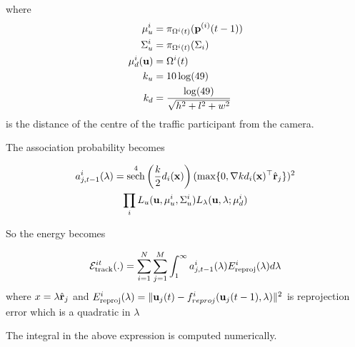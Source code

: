 \documentclass[10pt,twocolumn,letterpaper]{article}
\DeclareMathOperator{\sech}{sech}
\begin{document}
where 
\begin{align}
  \mu_u^i &= \pi_{\Omega^{i}(t)}(\mathbf{p}^{(i)}(t-1)) \\
  \Sigma_u^i &= \pi_{\Omega^{i}(t)}(\Sigma_i)\\
  \mu^i_d(\mathbf{u}) &= \Omega^{i}(t)\\
  k_u &= 10\log(49)\\
  k_d &= \frac{\log(49)}{\sqrt{h^2 + l^2 + w^2}}
  \label{eq:ptransmissionInit}
\end{align}
is the distance of the centre of the traffic participant from the camera.


The association probability becomes

\newcommand{\Lu}{L_u(\mathbf{u}, \mu^i_u,\Sigma^i_u)}
\newcommand{\Llambda}{L_{\lambda}(\mathbf{u}, \lambda; \mu^i_d)}
\begin{multline}
  \assocP = 
    \sech^4\left(\frac{k}{2}\dishort\right)
    (\max \{ 0, \nabla k\dishort^\top\ray \})^2\\
  \prod_i \Lu
    \Llambda \\
    \label{eq:assocCoeffEval}
\end{multline}

So the energy becomes

\begin{multline}
  \label{eq:integrand}
  \mathcal{E}^{it}_{\text{track}}(.) = 
    \sum_{i = 1}^N
    \sum_{j = 1}^{M}
    \int_1^{\infty}
    a^{i}_{j,t-1}(\lambda)
    E^i_{\text{reproj}}(\lambda)
    d\lambda
\end{multline}
where $x = \lambda \hat{\mathbf{r}}_j$ and $E^i_{\text{reproj}}(\lambda) = \|\mathbf{u}_j(t) -
f^i_{reproj}(\mathbf{u}_j(t-1), \lambda)\|^2$ is reprojection error which is a
quadratic in $\lambda$

The integral in the above expression is computed numerically.
\end{document}
